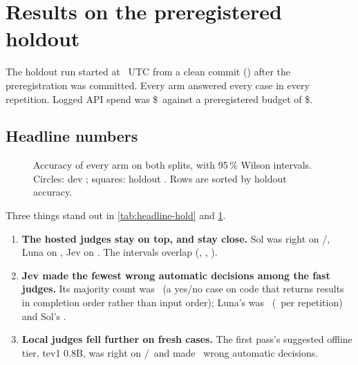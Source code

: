 \section{Results on the preregistered holdout \texorpdfstring{\prereg}{[preregistered]}}\label{sec:holdout}

The holdout run started at \HoldStarted\ UTC from a clean commit (\code{\HoldCommit}) after the
preregistration was committed. Every arm answered every case in every repetition. Logged API spend was
\$\HoldSpendUSD\ against a preregistered budget of \$\HoldBudgetUSD.

\subsection{Headline numbers}

\begin{table}[htbp]
\centering\small
\caption{Holdout \prereg, \HoldN\ cases, \HoldReps\ repetitions, policy .
Same conventions as \cref{tab:headline-dev}.}
\label{tab:headline-hold}

\end{table}

\begin{figure}[htbp]
\centering

\caption{Accuracy of every arm on both splits, with 95\,\% Wilson intervals. Circles: dev \screen;
squares: holdout \prereg. Rows are sorted by holdout accuracy.}
\label{fig:accuracy}
\end{figure}

Three things stand out in \cref{tab:headline-hold} and \cref{fig:accuracy}.
\begin{enumerate}
  \item \textbf{The hosted judges stay on top, and stay close.} Sol was right on \SolHoldAccK/\HoldN,
    Luna on \LunaHoldAccK, Jev on \JevHoldAccK. The intervals overlap
    (\SolHoldAccCI, \LunaHoldAccCI, \JevHoldAccCI).
  \item \textbf{Jev made the fewest wrong automatic decisions among the fast judges.} Its majority
    count was \JevHoldWaK\ (a yes/no case on code that returns results in completion order rather than
    input order); Luna's was \LunaHoldWaK\ (\LunaHoldWaRange\ per repetition) and Sol's \SolHoldWaK.
  \item \textbf{Local judges fell further on fresh cases.} The first pass's suggested offline tier,
    tev1 0.8B, was right on \TevPtEightHoldAccK/\HoldN\ and made \TevPtEightHoldWaK\ wrong automatic
    decisions.
\end{enumerate}


